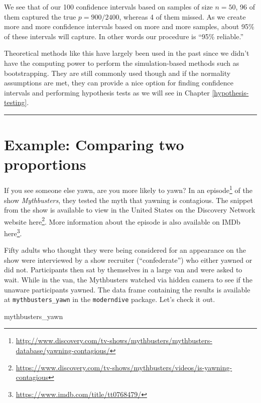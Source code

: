 \documentclass[12pt, krantz2,]{krantz}
\makeatletter
\newenvironment{Shaded}{\begin{snugshade}}{\end{snugshade}}
\newcommand{\NormalTok}[1]{#1}
\renewcommand{\href}[2]{#2\footnote{\url{#1}}}
\newenvironment{kframe}{%
\medskip{}
\setlength{\fboxsep}{.8em}
 \def\at@end@of@kframe{}%
 \ifinner\ifhmode%
  \def\at@end@of@kframe{\end{minipage}}%
  \begin{minipage}{\columnwidth}%
 \fi\fi%
 \def\FrameCommand##1{\hskip\@totalleftmargin \hskip-\fboxsep
 \colorbox{shadecolor}{##1}\hskip-\fboxsep
     \hskip-\linewidth \hskip-\@totalleftmargin \hskip\columnwidth}%
 \MakeFramed {\advance\hsize-\width
   \@totalleftmargin\z@ \linewidth\hsize
   \@setminipage}}%
 {\par\unskip\endMakeFramed%
 \at@end@of@kframe}
\renewenvironment{Shaded}{\begin{kframe}}{\end{kframe}}
\makeatother
\begin{document}
We see that of our 100 confidence intervals based on samples of size \(n=50\), 96 of them captured the true \(p = 900/2400\), whereas 4 of them missed. As we create more and more confidence intervals based on more and more samples, about 95\% of these intervals will capture. In other words our procedure is ``95\% reliable.''

Theoretical methods like this have largely been used in the past since we didn't have the computing power to perform the simulation-based methods such as bootstrapping. They are still commonly used though and if the normality assumptions are met, they can provide a nice option for finding confidence intervals and performing hypothesis tests as we will see in Chapter \ref{hypothesis-testing}.

\begin{center}\rule{0.5\linewidth}{\linethickness}\end{center}

\hypertarget{example-comparing-two-proportions}{%
\section{Example: Comparing two proportions}\label{example-comparing-two-proportions}}

If you see someone else yawn, are you more likely to yawn? In an \href{http://www.discovery.com/tv-shows/mythbusters/mythbusters-database/yawning-contagious/}{episode} of the show \emph{Mythbusters}, they tested the myth that yawning is contagious. The snippet from the show is available to view in the United States on the Discovery Network website \href{https://www.discovery.com/tv-shows/mythbusters/videos/is-yawning-contagious}{here}. More information about the episode is also available on IMDb \href{https://www.imdb.com/title/tt0768479/}{here}.

Fifty adults who thought they were being considered for an appearance on the show were interviewed by a show recruiter (``confederate'') who either yawned or did not. Participants then sat by themselves in a large van and were asked to wait. While in the van, the Mythbusters watched via hidden camera to see if the unaware participants yawned. The data frame containing the results is available at \texttt{mythbusters\_yawn} in the \texttt{moderndive} package. Let's check it out.

\begin{Shaded}
\begin{Highlighting}[]
\NormalTok{mythbusters_yawn}
\end{Highlighting}
\end{Shaded}
\end{document}

